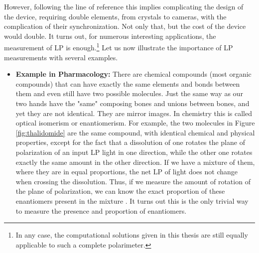 \documentclass[11pt, a4paper, twoside]{article} %
\begin{document}
However, following the line of reference \cite{incomplete} this implies complicating the design of the device, requiring double elements, from crystals to cameras, with the complication of their synchronization. Not only that, but the cost of the device would double. It turns out, for numerous interesting applications, the measurement of LP is enough.\footnote{In any case, the computational solutions given in this thesis are still equally applicable to such a complete polarimeter.} Let us now illustrate the importance of LP measurements with several examples. \vspace{-0.2cm}
\begin{itemize}

\item{\bf Example in Pharmacology: }There are chemical compounds (most organic compounds) that can have exactly the same elements and bonds between them and even still have two possible molecules. Just the same way as our two hands have the "same" composing bones and unions between bones, and yet they are not identical. They are mirror images. In chemistry this is called optical isomerism or enantiomerism. For example, the two molecules in Figure \ref{fig:thalidomide} are the same compound, with identical chemical and physical properties, except for the fact that a dissolution of one rotates the plane of polarization of an input LP light in one direction, while the other one rotates exactly the same amount in the other direction. If we have a mixture of them, where they are in equal proportions, the net LP of light does not change when crossing the dissolution. Thus, if we measure the amount of rotation of the plane of polarization, we can know the exact proportion of these enantiomers present in the mixture \cite{enantiomers}. It turns out this is the only trivial way to measure the presence and proportion of enantiomers. 


\end{itemize}
\end{document}
